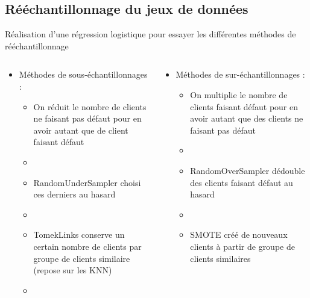 \documentclass[8pt,aspectratio=169,hyperref={unicode=true}]{beamer}
\begin{document}
\subsection{Rééchantillonnage du jeux de données}
\begin{frame}{\insertsection}{\insertsubsection}
    Réalisation d'une régression logistique pour essayer les différentes méthodes de rééchantillonnage
    \begin{columns}
        \begin{column}{.5\textwidth}
            \begin{itemize}
                \item Méthodes de sous-échantillonnages :
                      \begin{itemize}
                          \item On réduit le nombre de clients ne faisant pas défaut pour en avoir autant que de client faisant défaut
                          \item[]
                          \item RandomUnderSampler choisi ces derniers au hasard
                          \item[]
                          \item TomekLinks conserve un certain nombre de clients par groupe de clients similaire (repose sur les KNN)
                          \item[]
                      \end{itemize}
            \end{itemize}
        \end{column}
        \begin{column}{.5\textwidth}
            \begin{itemize}
                \item Méthodes de sur-échantillonnages :
                      \begin{itemize}
                          \item On multiplie le nombre de clients faisant défaut pour en avoir autant que des clients ne faisant pas défaut
                          \item[]
                          \item RandomOverSampler dédouble des clients faisant défaut au hasard
                          \item[]
                          \item SMOTE créé de nouveaux clients à partir de groupe de clients similaires

\end{itemize}
\end{itemize}
\end{column}
\end{columns}
\end{frame}
\end{document}
